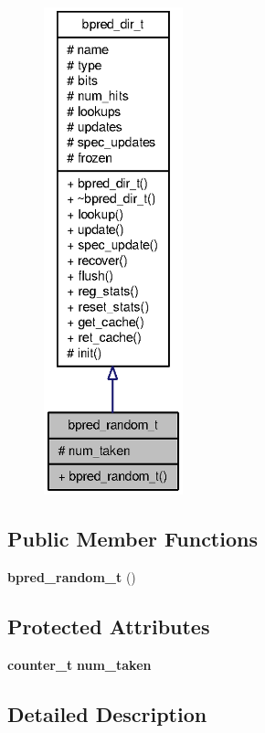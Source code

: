 \begin{figure}[H]
\begin{center}
\leavevmode
\includegraphics[height=400pt]{structbpred__random__t__coll__graph}
\end{center}
\end{figure}
\subsection*{Public Member Functions}
\begin{CompactItemize}
\item 
{\bf bpred\_\-random\_\-t} ()
\end{CompactItemize}
\subsection*{Protected Attributes}
\begin{CompactItemize}
\item 
{\bf counter\_\-t} {\bf num\_\-taken}
\end{CompactItemize}


\subsection{Detailed Description}


